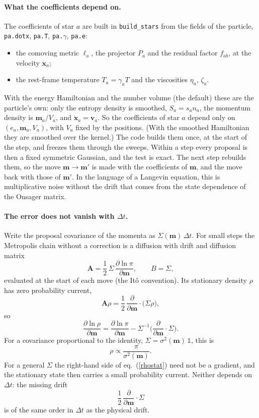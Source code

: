 \documentclass[11pt,aps,preprint,nofootinbib,superscriptaddress,tightenlines]{revtex4-2}
\newcommand{\one}{\mathds{1}}
\def\st{\begin{equation}}
\def\stp{\end{equation}}
\def\Eq#1{eq.~(\ref{#1})}
\let\oldparagraph\paragraph
\renewcommand{\paragraph}{\par\bigskip\oldparagraph}
\begin{document}
\paragraph{What the coefficients depend on.}  The coefficients of star $a$ are built in \texttt{build\_stars} from the fields of the
particle, \texttt{pa.dotx}, \texttt{pa.T}, \texttt{pa.}$\gamma$, \texttt{pa.e}:
\begin{itemize}
\item the comoving metric $\ell_a$, the projector $P_a$ and the residual factor $f_{ab}$, at the velocity $\dot{\bm x}_a$;
\item the rest-frame temperature $T_a=\gamma_aT$ and the viscosities $\eta_a$, $\zeta_a$.
\end{itemize}
With the energy Hamiltonian and the number volume (the default) these are the particle's own: only the entropy density is smoothed,
$S_a=s_an_a$, the momentum density is $\bm m_a/V_a$, and $\dot{\bm x}_a=\bm v_a$.  So the coefficients of star $a$ depend only on $(e_a,\bm m_a,V_a)$,
with $V_a$ fixed by the positions.  (With the smoothed Hamiltonian they are smoothed over the kernel.)  The
code builds them once, at the start of the step, and freezes them through the sweeps.  Within a step every proposal is then a
fixed symmetric Gaussian, and the test is exact.  The next step rebuilds them, so the move $\bm m\to\bm m'$ is made with the
coefficients of $\bm m$, and the move back with those of $\bm m'$.  In the language of a Langevin equation, this is
multiplicative noise without the drift that comes from the state dependence of the Onsager matrix.

\paragraph{The error does not vanish with $\Delta t$.}  Write the proposal covariance of the momenta as $\Sigma(\bm m)\,\Delta t$.  For
small steps the Metropolis chain without a correction is a diffusion with drift and diffusion matrix
\st
\bm A=\frac12\,\Sigma\,\frac{\partial\ln\pi}{\partial\bm m},\qquad B=\Sigma ,
\stp
evaluated at the start of each move (the It\^o convention).  Its stationary density $\rho$ has zero probability current,
\st
\bm A\rho=\frac12\,\frac{\partial}{\partial\bm m}\cdot\big(\Sigma\rho\big) ,
\stp
so
\st
\frac{\partial\ln\rho}{\partial\bm m}=\frac{\partial\ln\pi}{\partial\bm m}-\Sigma^{-1}\Big(\frac{\partial}{\partial\bm m}\cdot\Sigma\Big) .
\label{rhostat}
\stp
For a covariance proportional to the identity, $\Sigma=\sigma^2(\bm m)\,\one$, this is
\st
\rho\propto\frac{\pi}{\sigma^2(\bm m)} .
\stp
For a general $\Sigma$ the right-hand side of \Eq{rhostat} need not be a gradient, and the stationary state then carries a small
probability current.  Neither depends on $\Delta t$: the missing drift
\st
\frac12\,\frac{\partial}{\partial\bm m}\cdot\Sigma
\stp
is of the same order in $\Delta t$ as the physical drift.
\end{document}

